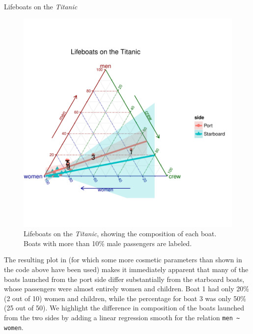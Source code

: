 \documentclass[10pt,krantz2]{krantz}\usepackage[]{graphicx}\usepackage[]{color}
\newenvironment{knitrout}{}{} %
\renewenvironment{knitrout}{\small\renewcommand{\baselinestretch}{.85}}{} %
\begin{document}
\begin{Example}[lifeboat1]{Lifeboats on the \emph{Titanic}}
\begin{knitrout}
\begin{figure}[!htbp]
\centerline{\includegraphics[width=.7\textwidth,clip,trim=0 80 0 80]{ch04/fig/lifeboats1-1} }

\caption[Lifeboats on the Titanic]{Lifeboats on the \emph{Titanic}, showing the composition of each boat.  Boats with more than 10\% male passengers are labeled.\label{fig:lifeboats1}}
\end{figure}


\end{knitrout}
The resulting plot in  (for which some more cosmetic
parameters than shown in the code above have been used) makes it immediately apparent
that many of the boats launched from the port side differ substantially
from the starboard boats, whose passengers were almost entirely women
and children.  Boat 1 had only 20\% (2 out of 10) women and children, while the percentage for boat 3 was only 50\% (25 out of 50). We highlight the difference in
composition of the boats launched from the two sides by adding a linear regression
smooth for the relation \verb|men ~ women|.


\end{Example}
\end{document}
